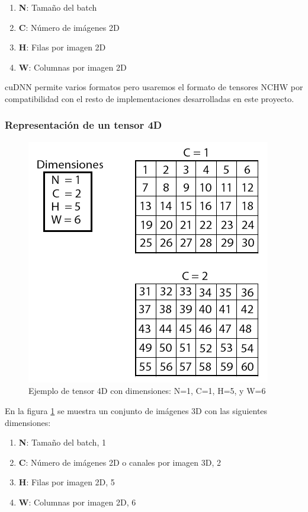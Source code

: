 \begin{enumerate}
	\item \textbf{N}: Tamaño del batch
	\item \textbf{C}: Número de imágenes 2D
	\item \textbf{H}: Filas por imagen 2D
	\item \textbf{W}: Columnas por imagen 2D
\end{enumerate}

cuDNN permite varios formatos pero usaremos el formato de tensores NCHW por compatibilidad con el resto de implementaciones desarrolladas en este proyecto.


\subsubsection{Representación de un tensor 4D}

\begin{figure}[H]
	\centering
	\includegraphics[scale=0.5]{imagenes/ejemplo_tensor.png}  
	\caption{Ejemplo de tensor 4D con dimensiones: N=1, C=1, H=5, y W=6}
	\label{fig:ejemplo_tensor}
\end{figure}

En la figura \ref{fig:ejemplo_tensor} se muestra un conjunto de imágenes 3D con las siguientes dimensiones:
\begin{enumerate}
	\item \textbf{N}: Tamaño del batch, 1
	\item \textbf{C}: Número de imágenes 2D o canales por imagen 3D, 2
	\item \textbf{H}: Filas por imagen 2D, 5
	\item \textbf{W}: Columnas por imagen 2D, 6
\end{enumerate}

